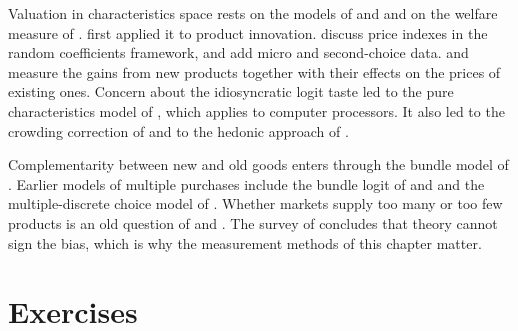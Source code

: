 Valuation in characteristics space rests on the models of \citet{Lancaster1966,Lancaster1971} and
\citet{McFadden1981} and on the welfare measure of \citet{SmallRosen1981}. \citet{Trajtenberg1989} first applied
it to product innovation. \citet{PakesBerryLevinsohn1993} discuss price indexes in the random coefficients
framework, and \citet{BerryLevinsohnPakes2004} add micro and second-choice data. \citet{Petrin2002} and
\citet{GoolsbeePetrin2004} measure the gains from new products together with their effects on the prices of
existing ones. Concern about the idiosyncratic logit taste led to the pure characteristics model of
\citet{BerryPakes2007}, which \citet{Song2007} applies to computer processors. It also led to the crowding
correction of \citet{AckerbergRysman2005} and to the hedonic approach of \citet{BajariBenkard2005}.

Complementarity between new and old goods enters through the bundle model of \citet{Gentzkow2007}. Earlier models
of multiple purchases include the bundle logit of \citet{ManskiSherman1980} and \citet{TrainMcFaddenBenAkiva1987}
and the multiple-discrete choice model of \citet{Hendel1999}. Whether markets supply too many or too few products
is an old question of \citet{Spence1976} and \citet{MankiwWhinston1986}. The survey of \citet{EatonLipsey1989}
concludes that theory cannot sign the bias, which is why the measurement methods of this chapter matter.

\section{Exercises}\label{sec:10-exercises}

